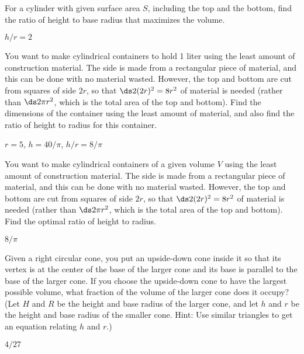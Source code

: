 \begin{enumialphparenastyle}
\begin{ex}
For a cylinder with given surface area $S$, including 
the top and the bottom, find the ratio of height to
base radius that maximizes the volume.
\begin{sol}
 $h/r=2$
\end{sol}
\end{ex}

\begin{ex}
You want to make cylindrical containers to hold 1 liter using the
least amount of construction material.  The side is made from a
rectangular piece of material, and this can be done with no material
wasted.  However, the top and bottom are cut from squares of side $2r$, so
that $\ds 2(2r)^2=8r^2$ of material is needed (rather than $\ds 2\pi r^2$, which is
the total area of the top and bottom).  Find the dimensions of the
container using the least amount of material, and also find the
ratio of height to
radius for this container.
\begin{sol}
 $r=5$, $h=40/\pi$, $h/r=8/\pi$
\end{sol}
\end{ex}

\begin{ex}
You want to make cylindrical containers of a given volume $V$ using the
least amount of construction material.  The side is made from a
rectangular piece of material, and this can be done with no material
wasted.  However, the top and bottom are cut from squares of side $2r$, so
that $\ds 2(2r)^2=8r^2$ of material is needed (rather than $\ds 2\pi r^2$, which is
the total area of the top and bottom).  Find the optimal ratio of height to
radius.
\begin{sol}
 $8/\pi$
\end{sol}
\end{ex}

\begin{ex}
Given a right circular cone, you put an upside-down cone inside it so that
its vertex is at the center of the base of the larger cone and its base is
parallel to the base of the larger cone.  If you choose the upside-down
cone to have the largest possible volume, what fraction of the volume of
the larger cone does it occupy?  (Let $H$ and $R$ be the height and base
radius of the larger cone, and let $h$ and $r$ be the height and base
radius of the smaller cone.  Hint: Use similar triangles to get an equation
relating $h$ and $r$.)
\begin{sol}
 $4/27$
\end{sol}
\end{ex}


\end{enumialphparenastyle}
